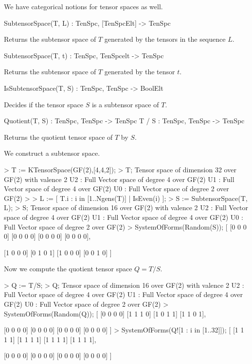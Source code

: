 We have categorical notions for tensor spaces as well.

\begin{intrinsics}
SubtensorSpace(T, L) : TenSpc, [TenSpcElt] -> TenSpc
\end{intrinsics}

Returns the subtensor space of $T$ generated by the tensors in the sequence $L$.

\begin{intrinsics}
SubtensorSpace(T, t) : TenSpc, TenSpcelt -> TenSpc
\end{intrinsics}

Returns the subtensor space of $T$ generated by the tensor $t$.

\begin{intrinsics}
IsSubtensorSpace(T, S) : TenSpc, TenSpc -> BoolElt
\end{intrinsics}

Decides if the tensor space $S$ is a subtensor space of $T$.

\begin{intrinsics}
Quotient(T, S) : TenSpc, TenSpc -> TenSpc
T / S : TenSpc, TenSpc -> TenSpc
\end{intrinsics}

Returns the quotient tensor space of $T$ by $S$.

\begin{example}
We construct a subtensor space.

\begin{code}
> T := KTensorSpace(GF(2),[4,4,2]);
> T;
Tensor space of dimension 32 over GF(2) with valence 2
U2 : Full Vector space of degree 4 over GF(2)
U1 : Full Vector space of degree 4 over GF(2)
U0 : Full Vector space of degree 2 over GF(2)
> 
> L := [ T.i : i in [1..Ngens(T)] | IsEven(i) ];
> S := SubtensorSpace(T, L);
> S;
Tensor space of dimension 16 over GF(2) with valence 2
U2 : Full Vector space of degree 4 over GF(2)
U1 : Full Vector space of degree 4 over GF(2)
U0 : Full Vector space of degree 2 over GF(2)
> SystemOfForms(Random(S));
[
    [0 0 0 0]
    [0 0 0 0]
    [0 0 0 0]
    [0 0 0 0],

    [1 0 0 0]
    [0 1 0 1]
    [1 0 0 0]
    [0 0 1 0]
]
\end{code}

Now we compute the quotient tensor space $Q=T/S$.

\begin{code}
> Q := T/S;
> Q;
Tensor space of dimension 16 over GF(2) with valence 2
U2 : Full Vector space of degree 4 over GF(2)
U1 : Full Vector space of degree 4 over GF(2)
U0 : Full Vector space of degree 2 over GF(2)
> SystemOfForms(Random(Q));
[
    [0 0 0 0]
    [1 1 1 0]
    [1 0 1 1]
    [1 1 0 1],

    [0 0 0 0]
    [0 0 0 0]
    [0 0 0 0]
    [0 0 0 0]
]
> SystemOfForms(Q![1 : i in [1..32]]);
[
    [1 1 1 1]
    [1 1 1 1]
    [1 1 1 1]
    [1 1 1 1],

    [0 0 0 0]
    [0 0 0 0]
    [0 0 0 0]
    [0 0 0 0]
]
\end{code}
\end{example}

